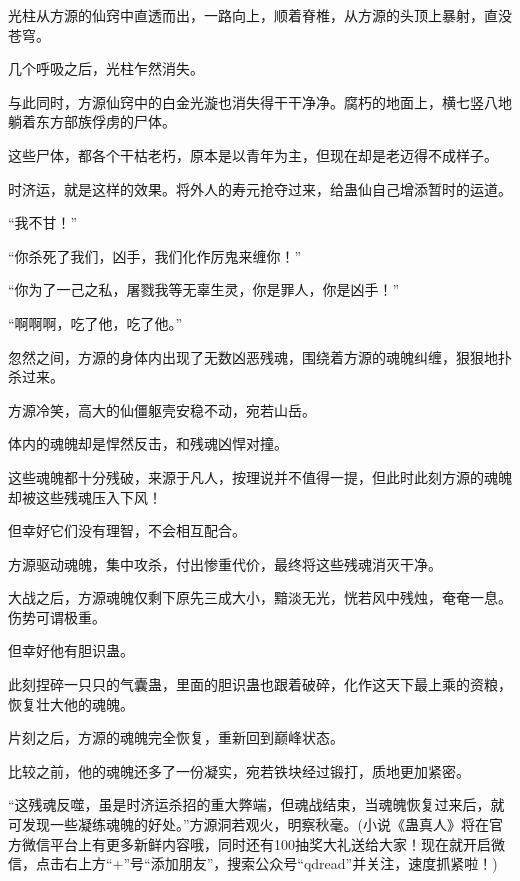 \begin{this_body}
光柱从方源的仙窍中直透而出，一路向上，顺着脊椎，从方源的头顶上暴射，直没苍穹。

几个呼吸之后，光柱乍然消失。

与此同时，方源仙窍中的白金光漩也消失得干干净净。腐朽的地面上，横七竖八地躺着东方部族俘虏的尸体。

这些尸体，都各个干枯老朽，原本是以青年为主，但现在却是老迈得不成样子。

时济运，就是这样的效果。将外人的寿元抢夺过来，给蛊仙自己增添暂时的运道。

“我不甘！”

“你杀死了我们，凶手，我们化作厉鬼来缠你！”

“你为了一己之私，屠戮我等无辜生灵，你是罪人，你是凶手！”

“啊啊啊，吃了他，吃了他。”

忽然之间，方源的身体内出现了无数凶恶残魂，围绕着方源的魂魄纠缠，狠狠地扑杀过来。

方源冷笑，高大的仙僵躯壳安稳不动，宛若山岳。

体内的魂魄却是悍然反击，和残魂凶悍对撞。

这些魂魄都十分残破，来源于凡人，按理说并不值得一提，但此时此刻方源的魂魄却被这些残魂压入下风！

但幸好它们没有理智，不会相互配合。

方源驱动魂魄，集中攻杀，付出惨重代价，最终将这些残魂消灭干净。

大战之后，方源魂魄仅剩下原先三成大小，黯淡无光，恍若风中残烛，奄奄一息。伤势可谓极重。

但幸好他有胆识蛊。

此刻捏碎一只只的气囊蛊，里面的胆识蛊也跟着破碎，化作这天下最上乘的资粮，恢复壮大他的魂魄。

片刻之后，方源的魂魄完全恢复，重新回到巅峰状态。

比较之前，他的魂魄还多了一份凝实，宛若铁块经过锻打，质地更加紧密。

“这残魂反噬，虽是时济运杀招的重大弊端，但魂战结束，当魂魄恢复过来后，就可发现一些凝练魂魄的好处。”方源洞若观火，明察秋毫。(小说《蛊真人》将在官方微信平台上有更多新鲜内容哦，同时还有100抽奖大礼送给大家！现在就开启微信，点击右上方“+”号“添加朋友”，搜索公众号“qdread”并关注，速度抓紧啦！)

\end{this_body}

